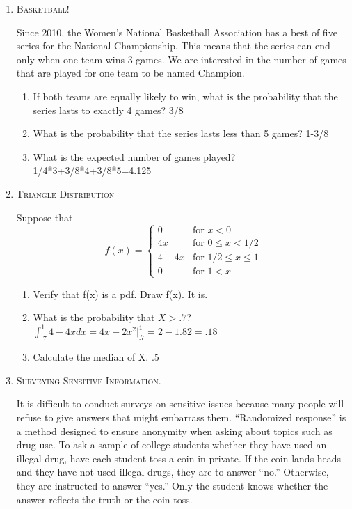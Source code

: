 \documentclass[11pt,letterpaper]{article}
\numberwithin{equation}{section}
\begin{document}
\begin{enumerate}[I]
\begin{enumerate}[1)]
\end{enumerate}
\pagebreak
\item \textsc{Basketball!} 

Since 2010, the Women's National Basketball Association has a best of five series for the National Championship.  This means that the series can end only when one team wins 3 games.  We are interested in the number of games that are played for one team to be named Champion.
\begin{enumerate}[1)]
\item If both teams are equally likely to win, what is the probability that the series lasts to exactly 4 games? 3/8
\item What is the probability that the series lasts less than 5 games? 1-3/8
\item What is the expected number of games played?  1/4*3+3/8*4+3/8*5=4.125
\end{enumerate}


\item \textsc{Triangle Distribution} 

Suppose that 
$$f(x)=\begin{cases} 0 & \text{for } x< 0\\ 4x & \text{for } 0\leq x < 1/2 \\ 4-4x  & \text{for }  1/2 \leq x\leq 1\\ 0 &\text{for } 1<x
\end{cases}$$
\begin{enumerate}[1)]
\item  Verify that f(x) is a pdf.  Draw f(x). It is.
\item What is the probability that $X > .7$? $\int_{.7}^1 4-4x dx= 4x-2x^2|_{.7}^1= 2-1.82=.18$
\item Calculate the median of X.  .5
\end{enumerate}
\item \textsc{Surveying Sensitive Information.}

  It is difficult to conduct surveys on sensitive issues because many people will refuse to give answers that might embarrass them. ``Randomized response'' is a method designed to ensure anonymity when asking about topics such as drug use. To ask a sample of college students whether they have used an illegal drug, have each student toss a coin in private. If the coin lands heads and they have not used illegal drugs, they are to answer ``no.'' Otherwise, they are instructed to answer ``yes.'' Only the student knows whether the answer reflects the truth or the coin toss.


\end{enumerate}
\end{document}
